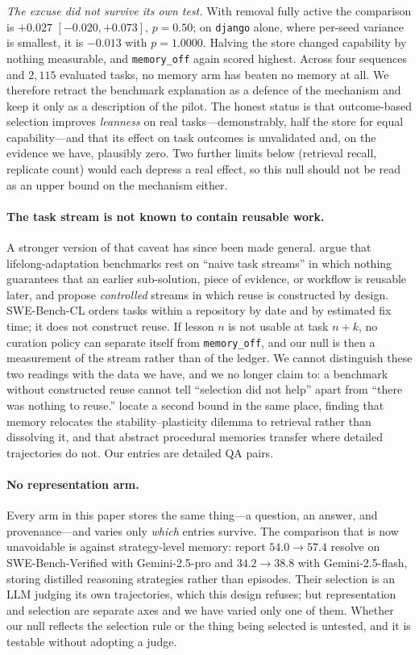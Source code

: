 \emph{The excuse did not survive its own test.} With removal fully
active the comparison is $+0.027$ $[-0.020, +0.073]$, $p = 0.50$; on
\texttt{django} alone, where per-seed variance is smallest, it is
$-0.013$ with $p = 1.0000$. Halving the store changed capability by
nothing measurable, and \texttt{memory\_off} again scored highest. Across
four sequences and $2{,}115$ evaluated tasks, no memory arm has beaten
no memory at all. We therefore retract the benchmark explanation as a
defence of the mechanism and keep it only as a description of the pilot.
The honest status is that outcome-based selection improves
\emph{leanness} on real tasks---demonstrably, half the store for equal
capability---and that its effect on task outcomes is unvalidated and, on
the evidence we have, plausibly zero. Two further limits below
(retrieval recall, replicate count) would each depress a real effect, so
this null should
not be read as an upper bound on the mechanism either.

\paragraph{The task stream is not known to contain reusable work.}
A stronger version of that caveat has since been made general.
\citet{agentcl2026} argue that lifelong-adaptation benchmarks rest on
``naive task streams'' in which nothing guarantees that an earlier
sub-solution, piece of evidence, or workflow is reusable later, and
propose \emph{controlled} streams in which reuse is constructed by
design. SWE-Bench-CL orders tasks within a repository by date and by
estimated fix time; it does not construct reuse. If lesson $n$ is not
usable at task $n+k$, no curation policy can separate itself from
\texttt{memory\_off}, and our null is then a measurement of the stream
rather than of the ledger. We cannot distinguish these two readings with
the data we have, and we no longer claim to: a benchmark without
constructed reuse cannot tell ``selection did not help'' apart from
``there was nothing to reuse.''
\citet{cl2memory2026} locate a second bound in the same place, finding
that memory relocates the stability--plasticity dilemma to retrieval
rather than dissolving it, and that abstract procedural memories transfer
where detailed trajectories do not. Our entries are detailed QA pairs.

\paragraph{No representation arm.}
Every arm in this paper stores the same thing---a question, an answer,
and provenance---and varies only \emph{which} entries survive. The
comparison that is now unavoidable is against strategy-level memory:
\citet{reasoningbank2026} report $54.0 \rightarrow 57.4$ resolve on
SWE-Bench-Verified with Gemini-2.5-pro and $34.2 \rightarrow 38.8$ with
Gemini-2.5-flash, storing distilled reasoning strategies rather than
episodes. Their selection is an LLM judging its own trajectories, which
this design refuses; but representation and selection are separate axes
and we have varied only one of them. Whether our null reflects the
selection rule or the thing being selected is untested, and it is
testable without adopting a judge.

